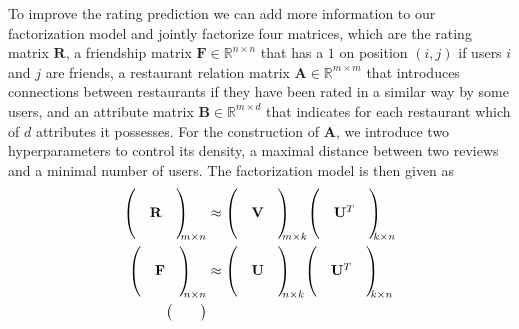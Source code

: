 \documentclass[a4paper]{article}
\begin{document}
To improve the rating prediction we can add more information to our factorization model and jointly factorize four matrices, which are 
the rating matrix $\mathbf{R}$,
a friendship matrix $\mathbf{F} \in \mathbb{R}^{n \times n}$ that has a $1$ on position $(i,j)$ if users $i$ and $j$ are friends,
a restaurant relation matrix $\mathbf{A} \in \mathbb{R}^{m \times m}$ that introduces connections between restaurants if they have been rated in a similar way by some users,
and an attribute matrix $\mathbf{B} \in \mathbb{R}^{m \times d}$ that indicates for each restaurant which of $d$ attributes it possesses. For the construction of $\mathbf{A}$, we introduce two hyperparameters to control its density, a maximal distance between two reviews and a minimal number of users. The factorization model is then given as
\begin{align}
{\begin{pmatrix}
  &    & \\
  & \mathbf{R} &\\
  &     &
\end{pmatrix}
\mkern-10mu}_{m \times n} &\approx
{\begin{pmatrix}
  &    & \\
  & \mathbf{V} &\\
  &     &
\end{pmatrix}
\mkern-10mu}_{m \times k}
{\begin{pmatrix}
  &    & \\
  & \mathbf{U}^T &\\
  &     &
\end{pmatrix}\mkern-10mu}_{k \times n} \\
{\begin{pmatrix}
  &    & \\
  & \mathbf{F} &\\
  &     &
\end{pmatrix}
\mkern-10mu}_{n \times n} &\approx
{\begin{pmatrix}
  &    & \\
  & \mathbf{U} &\\
  &     &
\end{pmatrix}
\mkern-10mu}_{n \times k}
{\begin{pmatrix}
  &    & \\
  & \mathbf{U}^T &\\
  &     &
\end{pmatrix}\mkern-10mu}_{k \times n} \\
{\begin{pmatrix}
  &    & \\

\end{pmatrix}}
\end{align}
\end{document}
